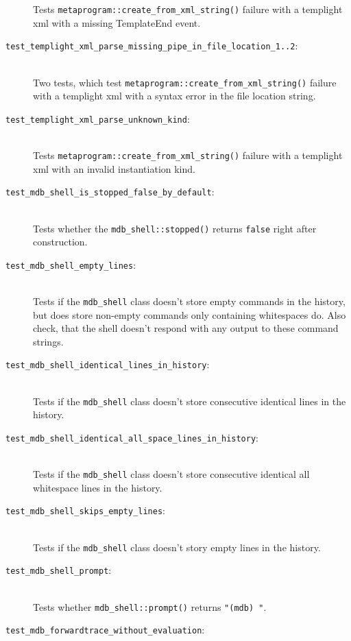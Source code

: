 \begin{description}
        Tests \texttt{metaprogram::create\_from\_xml\_string()} failure with a
        templight xml with a missing TemplateEnd event.
    \item[\texttt{test\_templight\_xml\_parse\_missing\_pipe\_in\_file\_location\_1..2}:] \hfill \\
        Two tests, which test \texttt{metaprogram::create\_from\_xml\_string()}
        failure with a templight xml with a syntax error in the file location
        string.
    \item[\texttt{test\_templight\_xml\_parse\_unknown\_kind}:] \hfill \\
        Tests \texttt{metaprogram::create\_from\_xml\_string()} failure with a
        templight xml with an invalid instantiation kind.
    \item[\texttt{test\_mdb\_shell\_is\_stopped\_false\_by\_default}:] \hfill \\
        Tests whether the \texttt{mdb\_shell::stopped()} returns \texttt{false}
        right after construction.
    \item[\texttt{test\_mdb\_shell\_empty\_lines}:] \hfill \\
        Tests if the \texttt{mdb\_shell} class doesn't store empty commands
        in the history, but does store non-empty commands only containing
        whitespaces do. Also check, that the shell doesn't respond with any
        output to these command strings.
    \item[\texttt{test\_mdb\_shell\_identical\_lines\_in\_history}:] \hfill \\
        Tests if the \texttt{mdb\_shell} class doesn't store consecutive
        identical lines in the history.
    \item[\texttt{test\_mdb\_shell\_identical\_all\_space\_lines\_in\_history}:] \hfill \\
        Tests if the \texttt{mdb\_shell} class doesn't store consecutive
        identical all whitespace lines in the history.
    \item[\texttt{test\_mdb\_shell\_skips\_empty\_lines}:] \hfill \\
        Tests if the \texttt{mdb\_shell} class doesn't story empty lines in
        the history.
    \item[\texttt{test\_mdb\_shell\_prompt}:] \hfill \\
        Tests whether \texttt{mdb\_shell::prompt()} returns \texttt{"(mdb) "}.
    \item[\texttt{test\_mdb\_forwardtrace\_without\_evaluation}:] \hfill \\

\end{description}

